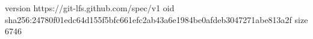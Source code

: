 version https://git-lfs.github.com/spec/v1
oid sha256:24780f01edc64d155f5bfc661efc2ab43a6e1984be0afdeb3047271abe813a2f
size 6746
